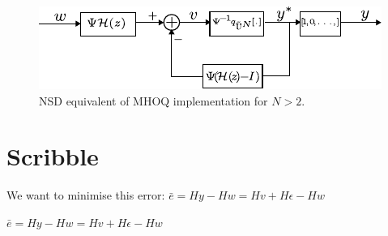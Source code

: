 \documentclass[a4paper]{article}
\begin{document}
\begin{figure}[!h]
	\centering
	\includegraphics[scale = 2]{figures/nsd_mhoq_implementation_N2.pdf}
	\caption{NSD equivalent of MHOQ implementation for $N>2$.}
	\label{fig:nsd_mhoq_implementation_N2}
\end{figure}



\newpage

 

\section{Scribble}

We want to minimise this error: $\bar{e} = H y - H w = H v + H \epsilon - H w$

$\bar{e} = H y - H w = H v + H \epsilon - H w$
\end{document}
